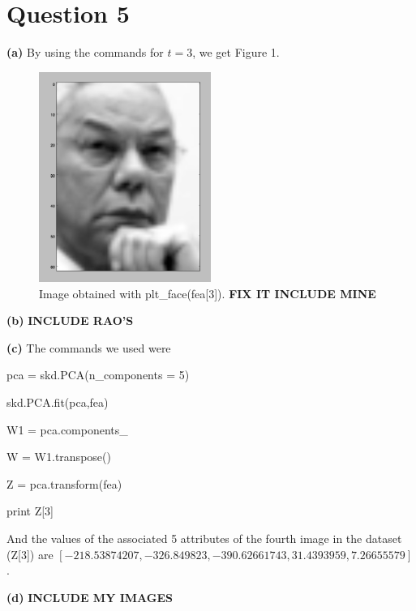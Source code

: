 \documentclass[leqno]{article}
\begin{document}
\hfill
\section*{Question 5} \textbf{(a)} By using the commands for $t = 3$, we get
Figure 1.

\begin{figure}[h!]
\includegraphics[width=0.5\textwidth]{face3}  
\caption{Image obtained with plt\_face(fea[3]). \textbf{FIX IT INCLUDE MINE}}
\end{figure}

\noindent \textbf{(b)} \textbf{INCLUDE RAO'S}

\hfill

\noindent \textbf{(c)} The commands we used were

\noindent pca = skd.PCA(n\_components = 5)

\noindent skd.PCA.fit(pca,fea)

\noindent W1 = pca.components\_

\noindent W = W1.transpose()

\noindent Z = pca.transform(fea)

\noindent print Z[3]

\noindent And the values of the associated 5 attributes of the fourth image in the dataset (Z[3]) are 
$[-218.53874207, -326.849823,   -390.62661743,   31.4393959,     7.26655579]$.
 
\hfill

\noindent \textbf{(d)} \textbf{INCLUDE MY IMAGES}  
\end{document}
